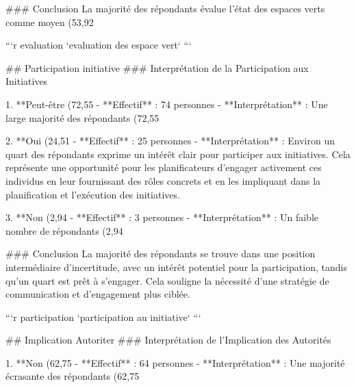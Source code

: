 ### Conclusion
La majorité des répondants évalue l'état des espaces verts comme moyen (53,92%

```{r evaluation}
`evaluation des espace vert`
```

## Participation initiative
### Interprétation de la Participation aux Initiatives

1. **Peut-être (72,55%
   - **Effectif** : 74 personnes
   - **Interprétation** : Une large majorité des répondants (72,55%

2. **Oui (24,51%
   - **Effectif** : 25 personnes
   - **Interprétation** : Environ un quart des répondants exprime un intérêt clair pour participer aux initiatives. Cela représente une opportunité pour les planificateurs d'engager activement ces individus en leur fournissant des rôles concrets et en les impliquant dans la planification et l'exécution des initiatives.

3. **Non (2,94%
   - **Effectif** : 3 personnes
   - **Interprétation** : Un faible nombre de répondants (2,94%

### Conclusion
La majorité des répondants se trouve dans une position intermédiaire d'incertitude, avec un intérêt potentiel pour la participation, tandis qu'un quart est prêt à s'engager. Cela souligne la nécessité d'une stratégie de communication et d'engagement plus ciblée.

```{r participation}
`participation au initiative`
```

## Implication Autoriter
### Interprétation de l'Implication des Autorités

1. **Non (62,75%
   - **Effectif** : 64 personnes
   - **Interprétation** : Une majorité écrasante des répondants (62,75%

